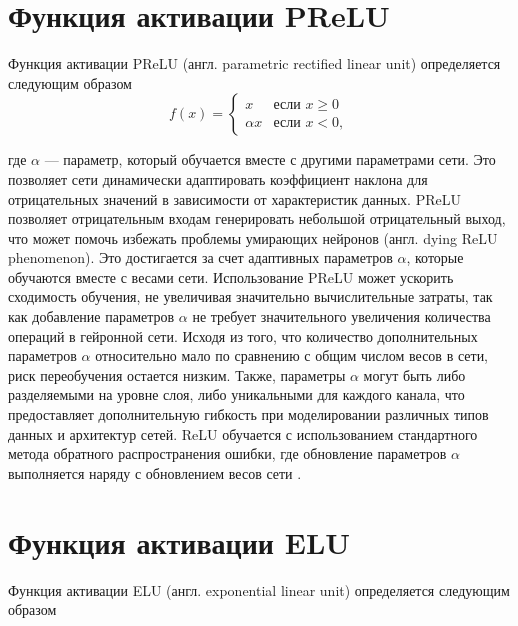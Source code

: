 	
	
	
\section {Функция активации PReLU}
	Функция активации PReLU (англ. parametric rectified linear unit) определяется следующим образом
	\begin{equation}
		f(x) = \begin{cases} 
			x & \text{если } x \geq 0 \\
			\alpha x & \text{если } x < 0,
		\end{cases}
	\end{equation}
	
	где \(\alpha\) — параметр, который обучается вместе с другими параметрами сети.\newline
	Это позволяет сети динамически адаптировать коэффициент наклона для отрицательных значений в зависимости от характеристик данных. PReLU позволяет отрицательным входам генерировать небольшой отрицательный выход, что может помочь избежать проблемы умирающих нейронов (англ. dying ReLU phenomenon). Это достигается за счет адаптивных параметров $\alpha$, которые обучаются вместе с весами сети. Использование PReLU может ускорить сходимость обучения, не увеличивая значительно вычислительные затраты, так как добавление параметров $\alpha$ не требует значительного увеличения количества операций в гейронной сети. Исходя из того, что количество дополнительных параметров $\alpha$ относительно мало по сравнению с общим числом весов в сети, риск переобучения остается низким.
	Также, параметры $\alpha$ могут быть либо разделяемыми на уровне слоя, либо уникальными для каждого канала, что предоставляет дополнительную гибкость при моделировании различных типов данных и архитектур сетей. ReLU обучается с использованием стандартного метода обратного распространения ошибки, где обновление параметров $\alpha$ выполняется наряду с обновлением весов сети \cite{survey}.
		

	
	
\section {Функция активации ELU}
	Функция активации ELU (англ. exponential linear unit) определяется следующим образом

